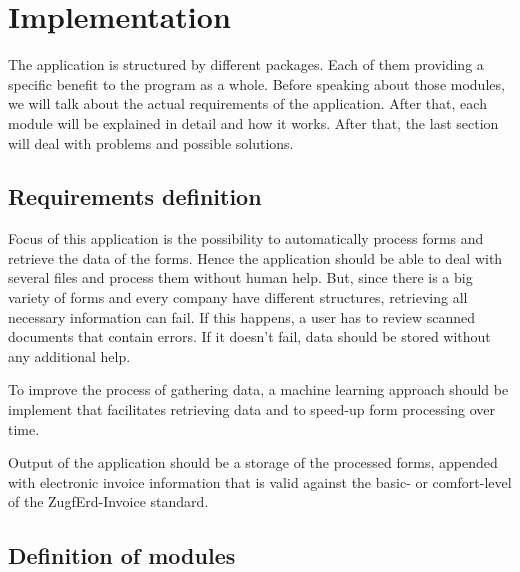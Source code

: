 %
% 

\chapter{Implementation}
\label{Implementation of the application}

The application is structured by different packages. Each of them providing a specific benefit to the program as a whole. Before speaking about those modules, we will talk about the actual requirements of the application. After that, each module will be explained in detail and how it works. After that, the last section will deal with problems and possible solutions.

\section{Requirements definition}

Focus of this application is the possibility to automatically process forms and retrieve the data of the forms. Hence the application should be able to deal with several files and process them without human help. But, since there is a big variety of forms and every company have different structures, retrieving all necessary information can fail. If this happens, a user has to review scanned documents that contain errors. If it doesn't fail, data should be stored without any additional help.

To improve the process of gathering data, a machine learning approach should be implement that facilitates retrieving data and to speed-up form processing over time.

Output of the application should be a storage of the processed forms, appended with electronic invoice information that is valid against the basic- or comfort-level of the ZugfErd-Invoice standard.

\section{Definition of modules}

